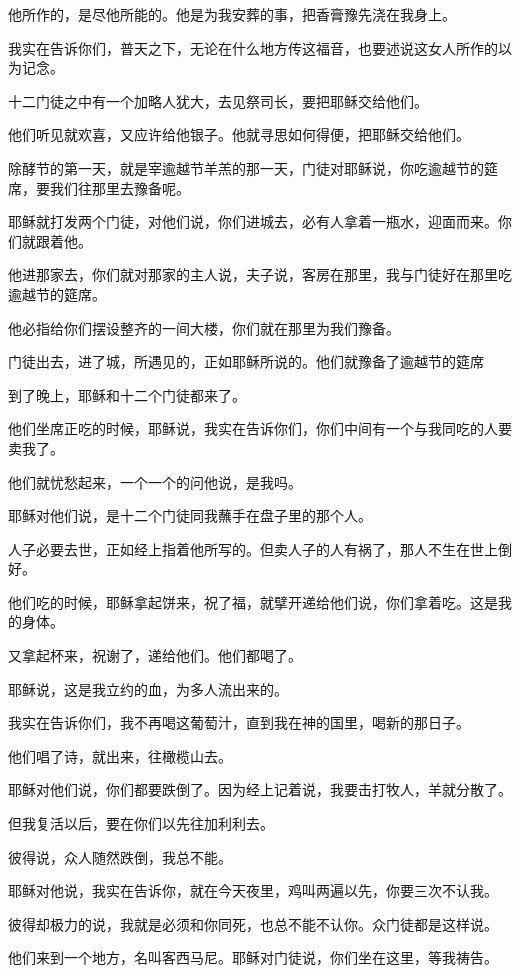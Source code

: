 \documentclass[12pt,oneside]{book}
\begin{document}
他所作的，是尽他所能的。他是为我安葬的事，把香膏豫先浇在我身上。

我实在告诉你们，普天之下，无论在什么地方传这福音，也要述说这女人所作的以为记念。

十二门徒之中有一个加略人犹大，去见祭司长，要把耶稣交给他们。

他们听见就欢喜，又应许给他银子。他就寻思如何得便，把耶稣交给他们。

除酵节的第一天，就是宰逾越节羊羔的那一天，门徒对耶稣说，你吃逾越节的筵席，要我们往那里去豫备呢。

耶稣就打发两个门徒，对他们说，你们进城去，必有人拿着一瓶水，迎面而来。你们就跟着他。

他进那家去，你们就对那家的主人说，夫子说，客房在那里，我与门徒好在那里吃逾越节的筵席。

他必指给你们摆设整齐的一间大楼，你们就在那里为我们豫备。

门徒出去，进了城，所遇见的，正如耶稣所说的。他们就豫备了逾越节的筵席

到了晚上，耶稣和十二个门徒都来了。

他们坐席正吃的时候，耶稣说，我实在告诉你们，你们中间有一个与我同吃的人要卖我了。

他们就忧愁起来，一个一个的问他说，是我吗。

耶稣对他们说，是十二个门徒同我蘸手在盘子里的那个人。

人子必要去世，正如经上指着他所写的。但卖人子的人有祸了，那人不生在世上倒好。

他们吃的时候，耶稣拿起饼来，祝了福，就擘开递给他们说，你们拿着吃。这是我的身体。

又拿起杯来，祝谢了，递给他们。他们都喝了。

耶稣说，这是我立约的血，为多人流出来的。

我实在告诉你们，我不再喝这葡萄汁，直到我在神的国里，喝新的那日子。

他们唱了诗，就出来，往橄榄山去。

耶稣对他们说，你们都要跌倒了。因为经上记着说，我要击打牧人，羊就分散了。

但我复活以后，要在你们以先往加利利去。

彼得说，众人随然跌倒，我总不能。

耶稣对他说，我实在告诉你，就在今天夜里，鸡叫两遍以先，你要三次不认我。

彼得却极力的说，我就是必须和你同死，也总不能不认你。众门徒都是这样说。

他们来到一个地方，名叫客西马尼。耶稣对门徒说，你们坐在这里，等我祷告。
\end{document}
